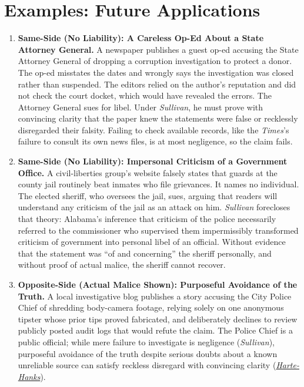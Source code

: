 \documentclass[12pt]{article}
\begin{document}
\section{Examples: Future Applications}
\begin{enumerate}

\item \textbf{Same-Side (No Liability): A Careless Op-Ed About a State Attorney General.} A newspaper publishes a guest op-ed accusing the State Attorney General of dropping a corruption investigation to protect a donor. The op-ed misstates the dates and wrongly says the investigation was closed rather than suspended. The editors relied on the author's reputation and did not check the court docket, which would have revealed the errors. The Attorney General sues for libel. Under \textit{Sullivan}, he must prove with convincing clarity that the paper knew the statements were false or recklessly disregarded their falsity. Failing to check available records, like the \textit{Times}'s failure to consult its own news files, is at most negligence, so the claim fails.

\item \textbf{Same-Side (No Liability): Impersonal Criticism of a Government Office.} A civil-liberties group's website falsely states that guards at the county jail routinely beat inmates who file grievances. It names no individual. The elected sheriff, who oversees the jail, sues, arguing that readers will understand any criticism of the jail as an attack on him. \textit{Sullivan} forecloses that theory: Alabama's inference that criticism of the police necessarily referred to the commissioner who supervised them impermissibly transformed criticism of government into personal libel of an official. Without evidence that the statement was ``of and concerning'' the sheriff personally, and without proof of actual malice, the sheriff cannot recover.

\item \textbf{Opposite-Side (Actual Malice Shown): Purposeful Avoidance of the Truth.} A local investigative blog publishes a story accusing the City Police Chief of shredding body-camera footage, relying solely on one anonymous tipster whose prior tips proved fabricated, and deliberately declines to review publicly posted audit logs that would refute the claim. The Police Chief is a public official; while mere failure to investigate is negligence (\textit{Sullivan}), purposeful avoidance of the truth despite serious doubts about a known unreliable source can satisfy reckless disregard with convincing clarity (\textit{\href{https://supreme.justia.com/cases/federal/us/491/657/}{Harte-Hanks}}).


\end{enumerate}
\end{document}
